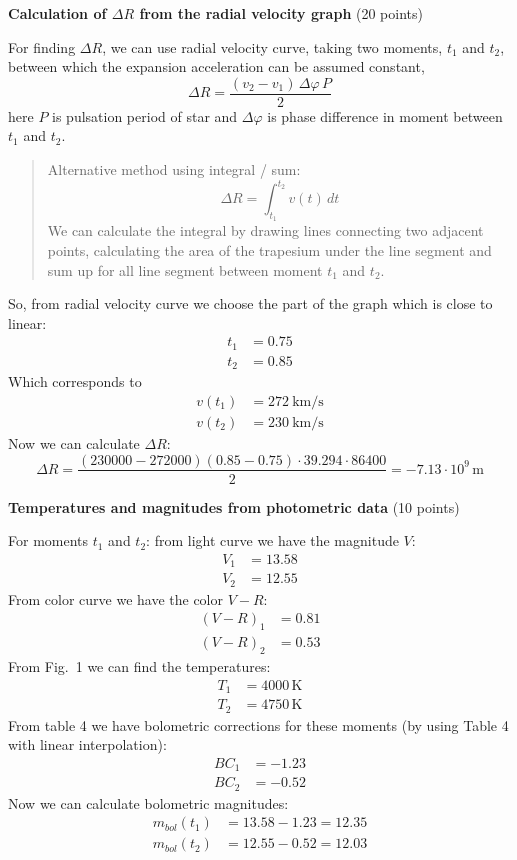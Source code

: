 \medskip
\noindent\textbf{Calculation of $\Delta R$ from the radial velocity graph}
\hfill(20 points)

For finding $\Delta R$, we can use radial velocity curve, taking two moments,
$t_1$ and $t_2$, between which the expansion acceleration can be assumed
constant,
\[ \Delta R = \frac{(v_2 - v_1)\,\Delta\varphi\,P}{2} \]
here $P$ is pulsation period of star and $\Delta\varphi$ is phase difference
in moment between $t_1$ and $t_2$.

\begin{quote}
Alternative method using integral / sum:
\[ \Delta R = \int_{t_1}^{t_2} v(t)\,dt \]
We can calculate the integral by drawing lines connecting two adjacent points,
calculating the area of the trapesium under the line segment and sum up for
all line segment between moment $t_1$ and $t_2$.
\end{quote}

So, from radial velocity curve we choose the part of the graph which is close
to linear:
\begin{align*}
  t_1 &= 0.75 \\
  t_2 &= 0.85
\end{align*}
Which corresponds to
\begin{align*}
  v(t_1) &= 272\ \mathrm{km/s} \\
  v(t_2) &= 230\ \mathrm{km/s}
\end{align*}
Now we can calculate $\Delta R$:
\[ \Delta R = \frac{(230000 - 272000)(0.85 - 0.75) \cdot 39.294 \cdot 86400}
   {2} = -7.13 \cdot 10^9\,\mathrm{m} \]

\medskip
\noindent\textbf{Temperatures and magnitudes from photometric data}
\hfill(10 points)

For moments $t_1$ and $t_2$: from light curve we have the magnitude $V$:
\begin{align*}
  V_1 &= 13.58 \\
  V_2 &= 12.55
\end{align*}
From color curve we have the color $V-R$:
\begin{align*}
  (V-R)_1 &= 0.81 \\
  (V-R)_2 &= 0.53
\end{align*}
From Fig.~1 we can find the temperatures:
\begin{align*}
  T_1 &= 4000\,\mathrm{K} \\
  T_2 &= 4750\,\mathrm{K}
\end{align*}
From table 4 we have bolometric corrections for these moments (by using
Table 4 with linear interpolation):
\begin{align*}
  BC_1 &= -1.23 \\
  BC_2 &= -0.52
\end{align*}
Now we can calculate bolometric magnitudes:
\begin{align*}
  m_{bol}(t_1) &= 13.58 - 1.23 = 12.35 \\
  m_{bol}(t_2) &= 12.55 - 0.52 = 12.03
\end{align*}

